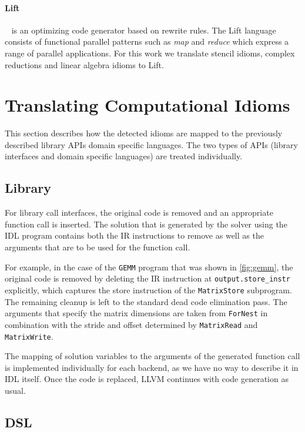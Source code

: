     \paragraph{Lift}~\cite{steuwer15rewrite, SteuwerRD17, HagedornSSGD18} is an
    optimizing code generator based on rewrite rules.
    The Lift language consists of functional parallel patterns such as
    \emph{map} and \emph{reduce} which  express a range of parallel
    applications.
    For this work we translate stencil idioms, complex reductions and linear
    algebra idioms to Lift.

\section{Translating Computational Idioms}

    This section describes how the detected idioms are mapped to the previously
    described library APIs domain specific languages.
    The two types of APIs (library interfaces and domain specific languages) are
    treated individually.

\subsection{Library}

    For library call interfaces, the original code is removed and an appropriate
    function call is inserted.
    The solution that is generated by the solver using the IDL program contains
    both the IR instructions to remove as well as the arguments that are to be
    used for the function call.

    For example, in the case of the {\tt GEMM} program that was shown in
    \autoref{fig:gemm}, the original code is removed by deleting the IR
    instruction at {\tt output.store\_instr} explicitly, which captures the
    store instruction of the {\tt MatrixStore} subprogram.
    The remaining cleanup is left to the standard dead code elimination pass.
    The arguments that specify the matrix dimensions are taken from
    {\tt ForNest} in combination with the stride and offset determined by
    {\tt MatrixRead} and {\tt MatrixWrite}.

    The mapping of solution variables to the arguments of the generated function
    call is implemented individually for each backend, as we have no way to
    describe it in IDL itself.
    Once the code is replaced, LLVM continues with code generation as usual.

\subsection{DSL}

